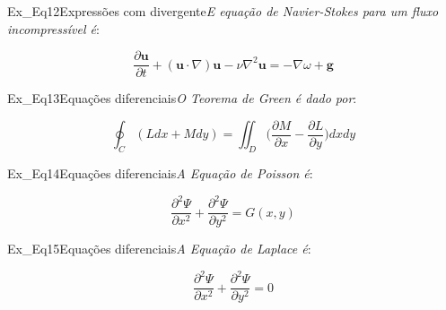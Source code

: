 \begin{texercise}{Ex_Eq12}{Expressões com divergente}\textit{E equação de Navier-Stokes para um fluxo incompressível é}:\par\smallskip%
\begin{tcboutputlisting}
    \begin{center}
        \begin{equation*}
            \frac{\partial{\mathbf{u}}}{\partial{t}} + 
            (\mathbf{u} \cdot \nabla)\mathbf{u} - 
            \nu \nabla^2 \mathbf{u} = - \nabla \omega + \mathbf{g}
        \end{equation*}
    \end{center}
\end{tcboutputlisting}
\tcbuselistingtext%
\end{texercise}

\begin{texercise}{Ex_Eq13}{Equações diferenciais}\textit{O Teorema de Green é dado por}:\par\smallskip%
\begin{tcboutputlisting}
    \begin{center}
        \begin{equation*}
            \oint_C (Ldx + Mdy) = \iint_D \bigg(\frac{\partial{M}}
            {\partial{x}} - \frac{\partial{L}}{\partial{y}}\bigg)dxdy
        \end{equation*}
    \end{center}
\end{tcboutputlisting}
\tcbuselistingtext%
\end{texercise}

\begin{texercise}{Ex_Eq14}{Equações diferenciais}\textit{A Equação de Poisson é}:\par\smallskip%
\begin{tcboutputlisting}
    \begin{center}
        \begin{equation*}
            \frac{\partial^{2}\Psi}{\partial x^{2}} +
            \frac{\partial^{2}\Psi}{\partial y^{2}} = G(x,y)
        \end{equation*}
    \end{center}
\end{tcboutputlisting}
\tcbuselistingtext%
\end{texercise}

\begin{texercise}{Ex_Eq15}{Equações diferenciais}\textit{A Equação de Laplace é}:\par\smallskip%
\begin{tcboutputlisting}
    \begin{center}
        \begin{equation*}
            \frac{\partial^{2}\Psi}{\partial x^{2}} + 
            \frac{\partial^{2}\Psi}{\partial y^{2}} = 0
        \end{equation*}
    \end{center}
\end{tcboutputlisting}
\tcbuselistingtext%
\end{texercise}

